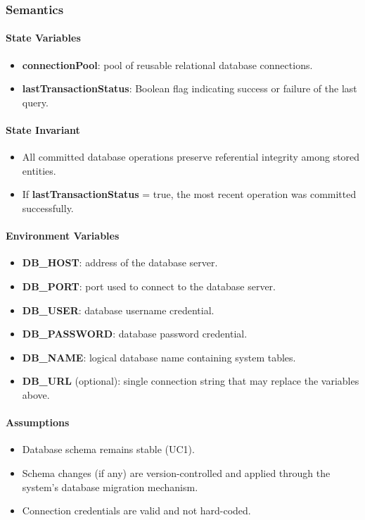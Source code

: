\documentclass[12pt, titlepage]{article}
\begin{document}
\subsubsection{Semantics}

\paragraph{State Variables}
\begin{itemize}
  \item \textbf{connectionPool}: pool of reusable relational database connections.
  \item \textbf{lastTransactionStatus}: Boolean flag indicating success or failure of the last query.
\end{itemize}

\paragraph{State Invariant}
\begin{itemize}
  \item All committed database operations preserve referential integrity among stored entities.
  \item If \textbf{lastTransactionStatus} = true, the most recent operation was committed successfully.
\end{itemize}

\paragraph{Environment Variables}
\begin{itemize}
  \item \textbf{DB\_HOST}: address of the database server.
  \item \textbf{DB\_PORT}: port used to connect to the database server.
  \item \textbf{DB\_USER}: database username credential.
  \item \textbf{DB\_PASSWORD}: database password credential.
  \item \textbf{DB\_NAME}: logical database name containing system tables.
  \item \textbf{DB\_URL} (optional): single connection string that may replace the variables above.
\end{itemize}

\paragraph{Assumptions}
\begin{itemize}
  \item Database schema remains stable (UC1).
  \item Schema changes (if any) are version-controlled and applied through the system’s database migration mechanism.
  \item Connection credentials are valid and not hard-coded.
\end{itemize}
\end{document}
